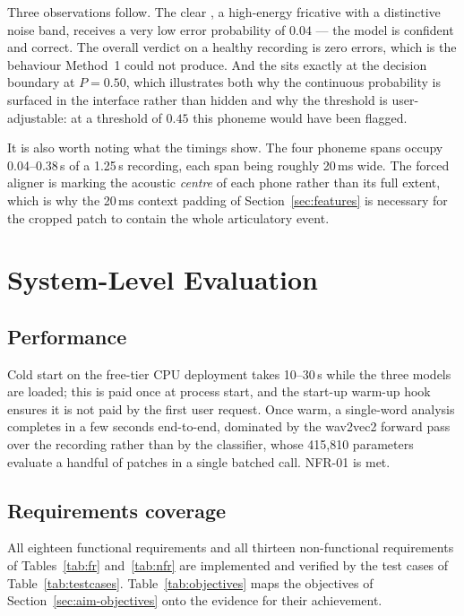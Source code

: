 Three observations follow. The clear , a high-energy fricative with a
distinctive noise band, receives a very low error probability of $0.04$ --- the
model is confident and correct. The overall verdict on a healthy recording is
zero errors, which is the behaviour Method~1 could not produce. And the 
sits exactly at the decision boundary at $P = 0.50$, which illustrates both why
the continuous probability is surfaced in the interface rather than hidden and
why the threshold is user-adjustable: at a threshold of $0.45$ this phoneme
would have been flagged.

It is also worth noting what the timings show. The four phoneme spans occupy
0.04--0.38\,s of a 1.25\,s recording, each span being roughly 20\,ms wide. The
forced aligner is marking the acoustic \emph{centre} of each phone rather than
its full extent, which is why the 20\,ms context padding of
Section~\ref{sec:features} is necessary for the cropped patch to contain the
whole articulatory event.

\section{System-Level Evaluation}
\label{sec:res-system}

\subsection{Performance}

Cold start on the free-tier CPU deployment takes 10--30\,s while the three
models are loaded; this is paid once at process start, and the start-up warm-up
hook ensures it is not paid by the first user request. Once warm, a single-word
analysis completes in a few seconds end-to-end, dominated by the wav2vec2
forward pass over the recording rather than by the classifier, whose 415{,}810
parameters evaluate a handful of patches in a single batched call. NFR-01 is
met.

\subsection{Requirements coverage}

All eighteen functional requirements and all thirteen non-functional
requirements of Tables~\ref{tab:fr} and~\ref{tab:nfr} are implemented and
verified by the test cases of Table~\ref{tab:testcases}.
Table~\ref{tab:objectives} maps the objectives of
Section~\ref{sec:aim-objectives} onto the evidence for their achievement.

